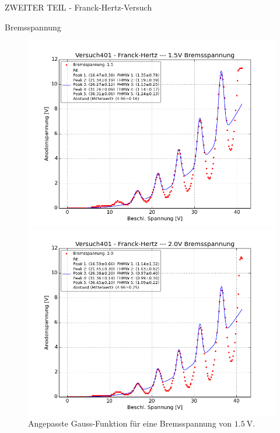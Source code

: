 \begin{appendix}
\begin{chapter}{ZWEITER TEIL - Franck-Hertz-Versuch}
\begin{section}{Bremsspannung}
      
      \newpage
      \begin{figure}[ht!]
        \centering
        \begin{minipage}{0.48\textwidth}
          \centering
          \includegraphics[width=\textwidth]
              {Figures/Versuch401-Franck-Hertz-1_5VBremsspannung_Beschl_Spannung_Anodenspannung.png}
          \caption{Angepasste Gauss-Funktion für eine Bremsspannung von 
              $\SI{1.5}{\volt}$.}
          \label{fig:AnhangFHB15V}
        \end{minipage} \quad
        \begin{minipage}{0.48\textwidth}
          \centering
          \includegraphics[width=\textwidth]
              {Figures/Versuch401-Franck-Hertz-2_0VBremsspannung_Beschl_Spannung_Anodenspannung.png}

\end{minipage}
\end{figure}
\end{section}
\end{chapter}
\end{appendix}
